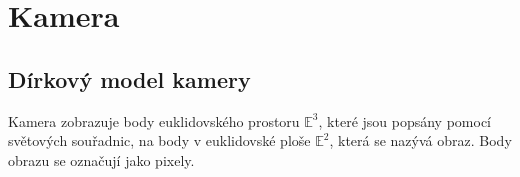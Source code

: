 \documentclass[twoside]{ctuthesis}
\newcommand{\spc}[2]{$\mathbb{#1}^{#2}$}
\newcommand{\tl}[1]{$\mathbf{#1}$}
\begin{document}




\chapter{Kamera}

\section{Dírkový model kamery}
Kamera zobrazuje body euklidovského prostoru $\mathbb{E}^3$, které jsou popsány pomocí světových souřadnic, na body v euklidovské ploše $\mathbb{E}^2$, která se nazývá obraz. Body obrazu se označují jako pixely. 
\end{document}
